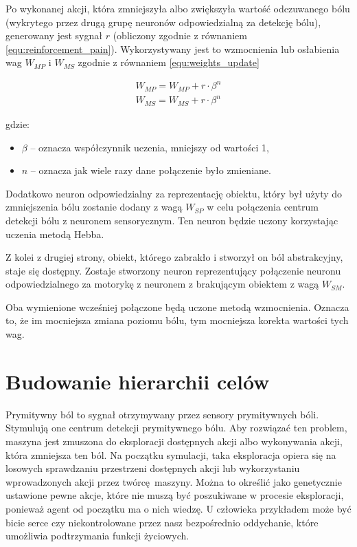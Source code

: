 Po wykonanej akcji, która zmniejszyła albo zwiększyła wartość odczuwanego bólu 
(wykrytego przez drugą grupę neuronów odpowiedzialną za detekcję bólu), 
generowany jest sygnał $r$ (obliczony zgodnie z równaniem 
\ref{equ:reinforcement_pain}). Wykorzystywany jest to wzmocnienia lub 
osłabienia wag $W_{MP}$ i $W_{MS}$ zgodnie z równaniem \ref{equ:weights_update}

\begin{equation}
	\label{equ:weights_update}
	\begin{aligned}
		W_{MP} = W_{MP} + r \cdot \beta ^ n \\
		W_{MS} = W_{MS} + r \cdot \beta ^ n
	\end{aligned}
\end{equation}

gdzie:
\begin{itemize}
	\item $\beta$ -- oznacza współczynnik uczenia, mniejszy od wartości 1,
	\item $n$ -- oznacza jak wiele razy dane połączenie było zmieniane.
\end{itemize}

Dodatkowo neuron odpowiedzialny za reprezentację obiektu, który był użyty do 
zmniejszenia bólu zostanie dodany z wagą $W_{SP}$ w celu połączenia centrum 
detekcji bólu z neuronem sensorycznym. Ten neuron będzie uczony korzystając 
uczenia metodą Hebba.

Z kolei z drugiej strony, obiekt, którego zabrakło i stworzył on ból 
abstrakcyjny, staje się dostępny. Zostaje stworzony neuron reprezentujący 
połączenie neuronu odpowiedzialnego za motorykę z neuronem z brakującym 
obiektem z wagą $W_{SM}$.

Oba wymienione wcześniej połączone będą uczone metodą wzmocnienia. Oznacza to, 
że im mocniejsza zmiana poziomu bólu, tym mocniejsza korekta wartości tych wag. 

\section{Budowanie hierarchii celów}

Prymitywny ból to sygnał otrzymywany przez sensory prymitywnych bóli. Stymulują 
one centrum detekcji prymitywnego bólu. Aby rozwiązać ten problem, maszyna jest 
zmuszona do eksploracji dostępnych akcji albo wykonywania akcji, która 
zmniejsza ten ból. Na początku symulacji, taka eksploracja opiera się na 
losowych sprawdzaniu przestrzeni dostępnych akcji lub wykorzystaniu 
wprowadzonych akcji przez twórcę maszyny. Można to określić jako genetycznie 
ustawione pewne akcje, które nie muszą być poszukiwane w procesie eksploracji, 
ponieważ agent od początku ma o nich wiedzę. U człowieka przykładem może być 
bicie serce czy niekontrolowane przez nasz bezpośrednio oddychanie, które 
umożliwia podtrzymania funkcji życiowych.

